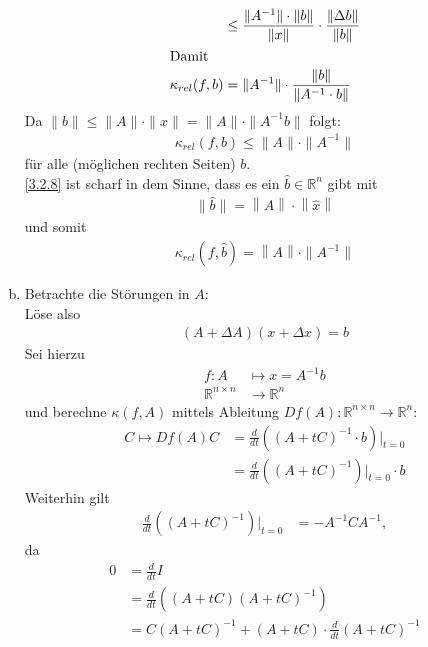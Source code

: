 \documentclass[ngerman,fontsize=11pt, paper=a4, parskip=half, titlepage=true, toc=bib]{scrbook}
\newcommand{\R}{\mathds{R}}
\newcommand{\nn}[1]{\left\| #1 \right\|}
\begin{document}
\begin{enumerate}[a)]
\begin{align}
                                                    & \leq  \frac{\|A^{-1}\|\cdot \|b\|}{\|x\|} \cdot \frac{\|\Delta b\|}{\|b\|} \\
      \intertext{Damit}
      \kappa_{rel} (f,b) &= \|A^{-1} \| \cdot \frac{\|b\|}{\|A^{-1}\cdot b\|} \label{III.2.7}
    \end{align}
    Da $\|b\| \leq \|A\|\cdot\|x\| = \|A\|\cdot \|A^{-1}b\|$ folgt:
    \begin{gather}
      \kappa_{rel}(f,b) \leq \|A\| \cdot \|A^{-1}\| \label{III.2.8}
    \end{gather}
    für alle (möglichen rechten Seiten) $b $.\\
    \ref{3.2.8} ist scharf in dem Sinne, dass es ein $\widehat{b}\in \R^n$ gibt 
    mit 
    \begin{gather*}
      \|\widehat{b}\| = \nn{A}\cdot \nn{\widehat{x}}
    \end{gather*}
    und somit
    \begin{gather*}
      \kappa_{rel}(f,\widehat{b}) = \nn{A}\cdot \| A^{-1}\|
    \end{gather*} %
  \item Betrachte die Störungen in $A$:\\
    Löse also 
    \begin{gather*}
      (A+\Delta A)(x+\Delta x) = b
    \end{gather*}
    Sei hierzu
    \begin{align*}
      f:A&\mapsto x= A^{-1}b \\
      \R^{n\times n}&\rightarrow \R^n
    \end{align*}
    und berechne $\kappa(f,A)$ mittels Ableitung $Df(A):\R^{n\times n} \rightarrow \R^n$:
    \begin{align*}
      C\mapsto Df(A) C&= \frac{d}{dt} \left((A+tC)^{-1} \cdot b\right) \Big\vert_{t=0} \\
                      & = \frac{d}{dt}\left((A+tC)^{-1}\right)\Big\vert_{t=0}\cdot b
    \end{align*}			
    Weiterhin gilt
    \begin{align}
      \frac{d}{dt} \left((A+tC)^{-1}\right) \Big\vert_{t=0} &= -A^{-1}CA^{-1}, \label{III.2.9}
    \end{align}
    da
    \begin{align*}
      0&= \frac{d}{dt}I \\
       &= \frac{d}{dt}\left( (A+tC)(A+tC)^{-1}\right)\\
       &= C(A+tC)^{-1} +(A+tC)\cdot \frac{d}{dt}(A+tC)^{-1} \\

\end{align*}
\end{enumerate}
\end{document}
